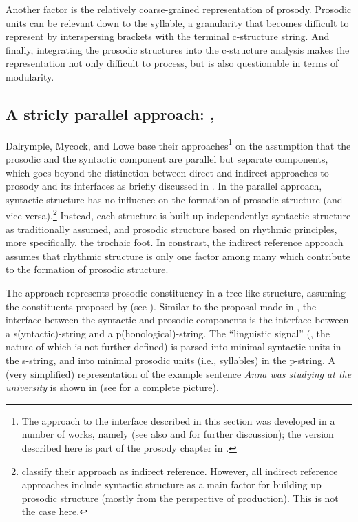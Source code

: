 \documentclass[output=paper,hidelinks]{langscibook}
\begin{document}
Another factor is the relatively coarse-grained representation of prosody. Prosodic units can be relevant down to the syllable, a granularity that becomes difficult to represent by interspersing brackets with the terminal c-structure string.
And finally, integrating the prosodic structures into the c-structure analysis makes the representation not only difficult to process, but is also questionable in terms of modularity.


\subsection{A stricly parallel approach: \citet{DM11}, \citet{MycockLowe2013}}
\label{subsec:Dalrympleetal}

Dalrymple, Mycock, and Lowe base their approaches\footnote{The approach to the interface described in this section was developed in a number of works, namely \citet{Mycock2006, DM11, MycockLowe2013} (see also \citealt{lowe:16a} and \citealt{Jones2016} for further discussion); the version described here is part of the prosody chapter in \citealt{DLM:LFG}.} on the assumption that the prosodic and the syntactic component are parallel but separate components, which goes beyond the distinction between direct and indirect approaches to prosody and its interfaces as briefly discussed in . In the parallel approach, syntactic structure has no influence on the formation of prosodic structure (and vice versa).\footnote{\citet[398]{DLM:LFG} classify their approach as indirect reference. However, all indirect reference approaches include syntactic structure as a main factor for building up prosodic structure (mostly from the perspective of production). This is not the case here.} Instead, each structure is built up independently: syntactic structure as traditionally assumed, and prosodic structure based on rhythmic principles, more specifically, the trochaic foot. In constrast, the indirect reference approach assumes that rhythmic structure is only one factor among many which contribute to the formation of prosodic structure.

The approach represents prosodic constituency in a tree-like structure, assuming the constituents proposed by \citet{Selkirk1995} (see ). Similar to the proposal made in  \citet{boegel-etal2010}, the interface between the syntactic and prosodic components is the interface between a s(yntactic)-string and a p(honolog\-i\-cal)-string. The ``linguistic signal'' (\citet[][407]{DLM:LFG}, the nature of which is not further defined) is parsed into minimal syntactic units in the s-string, and into minimal prosodic units (i.e., syllables) in the p-string.
A (very simplified) representation of the example sentence {\em Anna was studying at the university} is shown in  (see  for a complete picture).
\end{document}

